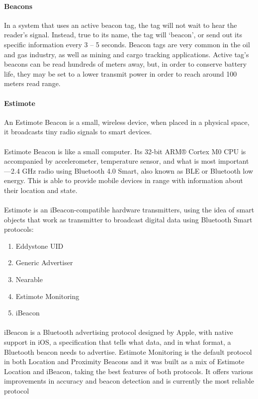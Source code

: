 \documentclass[12pt,a4paper]{article}
\begin{document}
\begin{appendices}
      \paragraph{Beacons} 
        In a system that uses an active beacon tag, the tag will not wait to hear the reader’s signal. Instead, true to its name, the tag will ‘beacon’, or send out its specific information every 3 – 5 seconds. Beacon tags are very common in the oil and gas industry, as well as mining and cargo tracking applications. Active tag’s beacons can be read hundreds of meters away, but, in order to conserve battery life, they may be set to a lower transmit power in order to reach around 100 meters read range.
      \paragraph{Estimote} 
        An Estimote Beacon is a small, wireless device, when placed in a physical space, it broadcasts tiny radio signals to smart devices.
      \paragraph{} 
        Estimote Beacon is like a small computer. Its 32-bit ARM® Cortex M0 CPU is accompanied by accelerometer, temperature sensor, and what is most important—2.4 GHz radio using Bluetooth 4.0 Smart, also known as BLE or Bluetooth low energy. This is able to provide mobile devices in range with information about their location and state.
      \paragraph{} 
        Estimote is an iBeacon-compatible hardware transmitters, using the idea of smart objects that work as transmitter to broadcast digital data using Bluetooth Smart protocols:
      \begin{enumerate}
        \item Eddystone UID
        \item Generic Advertiser
        \item Nearable
        \item Estimote Monitoring
        \item iBeacon
      \end{enumerate}
      \paragraph{}
        iBeacon is a Bluetooth advertising protocol designed by Apple, with native support in iOS, a specification that tells what data, and in what format, a Bluetooth beacon needs to advertise. Estimote Monitoring is the default protocol in both Location and Proximity Beacons and it was built as a mix of Estimote Location and iBeacon, taking the best features of both protocols. It offers various improvements in accuracy and beacon detection and is currently the most reliable protocol
  

\end{appendices}
\end{document}
